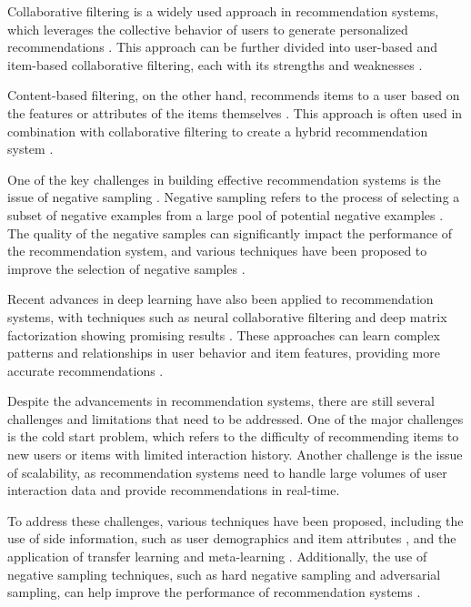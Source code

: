 \documentclass[11pt,a4paper]{article}
\begin{document}
Collaborative filtering is a widely used approach in recommendation systems, which leverages the collective behavior of users to generate personalized recommendations \cite{doi:10.1145/3097983.3098202}. This approach can be further divided into user-based and item-based collaborative filtering, each with its strengths and weaknesses \cite{doi:10.1145/3366423.3380303}. 

Content-based filtering, on the other hand, recommends items to a user based on the features or attributes of the items themselves \cite{doi:10.1007/s40747-024-01649-z}. This approach is often used in combination with collaborative filtering to create a hybrid recommendation system \cite{doi:10.1145/3366424.3386195}. 

One of the key challenges in building effective recommendation systems is the issue of negative sampling \cite{doi:10.1007/978-3-030-47436-2_46}. Negative sampling refers to the process of selecting a subset of negative examples from a large pool of potential negative examples \cite{doi:10.1145/3485447.3511965}. The quality of the negative samples can significantly impact the performance of the recommendation system, and various techniques have been proposed to improve the selection of negative samples \cite{arxiv:2206.01197}.

Recent advances in deep learning have also been applied to recommendation systems, with techniques such as neural collaborative filtering and deep matrix factorization showing promising results \cite{arxiv:1810.07076}. These approaches can learn complex patterns and relationships in user behavior and item features, providing more accurate recommendations \cite{arxiv:2010.12523}.

Despite the advancements in recommendation systems, there are still several challenges and limitations that need to be addressed. One of the major challenges is the cold start problem, which refers to the difficulty of recommending items to new users or items with limited interaction history. Another challenge is the issue of scalability, as recommendation systems need to handle large volumes of user interaction data and provide recommendations in real-time.

To address these challenges, various techniques have been proposed, including the use of side information, such as user demographics and item attributes \cite{arxiv:2209.05987}, and the application of transfer learning and meta-learning \cite{doi:10.1109/cvpr.2019.01155}. Additionally, the use of negative sampling techniques, such as hard negative sampling and adversarial sampling, can help improve the performance of recommendation systems \cite{doi:10.24963/ijcai.2022/348}.
\end{document}
